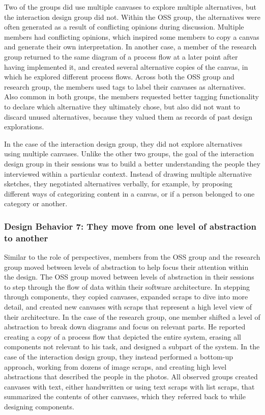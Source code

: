 \documentclass[12pt,fleqn]{ucithesis}
\begin{document}
Two of the groups did use multiple canvases to explore multiple alternatives, but the interaction design group did not. Within the OSS group, the alternatives were often generated as a result of conflicting opinions during discussion. Multiple members had conflicting opinions, which inspired some members to copy a canvas and generate their own interpretation. In another case, a member of the research group returned to the same diagram of a process flow at a later point after having implemented it, and created several alternative copies of the canvas, in which he explored different process flows. Across both the OSS group and research group, the members used tags to label their canvases as alternatives. Also common in both groups, the members requested better tagging functionality to declare which alternative they ultimately chose, but also did not want to discard unused alternatives, because they valued them as records of past design explorations.

In the case of the interaction design group, they did not explore alternatives using multiple canvases. Unlike the other two groups, the goal of the interaction design group in their sessions was to build a better understanding the people they interviewed within a particular context. Instead of drawing multiple alternative sketches, they negotiated alternatives verbally, for example, by proposing different ways of categorizing content in a canvas, or if a person belonged to one category or another.

\subsubsection{Design Behavior 7: They move from one level of abstraction to another}

Similar to the role of perspectives, members from the OSS group and the research group moved between levels of abstraction to help focus their attention within the design. The OSS group moved between levels of abstraction in their sessions to step through the flow of data within their software architecture. In stepping through components, they copied canvases, expanded scraps to dive into more detail, and created new canvases with scraps that represent a high level view of their architecture. In the case of the research group, one member shifted a level of abstraction to break down diagrams and focus on relevant parts. He reported creating a copy of a process flow that depicted the entire system, erasing all components not relevant to his task, and designed a subpart of the system. In the case of the interaction design group, they instead performed a bottom-up approach, working from dozens of image scraps, and creating high level abstractions that described the people in the photos. All observed groups created canvases with text, either handwritten or using text scraps with list scraps, that summarized the contents of other canvases, which they referred back to while designing components. 
\end{document}
